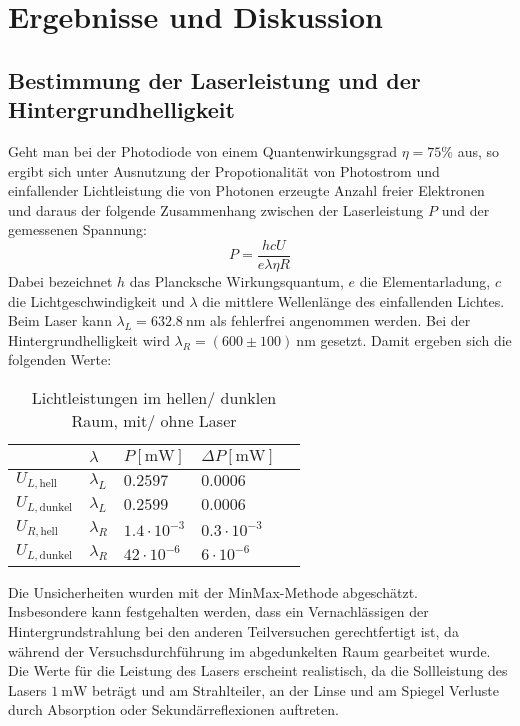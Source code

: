 \documentclass[11pt,a4paper,oneside]{scrartcl}
\begin{document}
\section{Ergebnisse und Diskussion}
\subsection{Bestimmung der Laserleistung und der Hintergrundhelligkeit}

Geht man bei der Photodiode von einem Quantenwirkungsgrad $\eta=75\%$ aus, so ergibt sich unter Ausnutzung der Propotionalität von Photostrom und einfallender Lichtleistung die von Photonen erzeugte Anzahl freier Elektronen und daraus der folgende Zusammenhang zwischen der Laserleistung $P$ und der gemessenen Spannung:
\begin{equation}\label{P_diode}
P=\frac{hcU}{e\lambda\eta R}
\end{equation}
Dabei bezeichnet $h$ das Plancksche Wirkungsquantum, $e$ die Elementarladung, $c$ die Lichtgeschwindigkeit und $\lambda$ die mittlere Wellenlänge des einfallenden Lichtes. Beim Laser kann $\lambda_L=632.8\ \mathrm{nm}$ als fehlerfrei angenommen werden. Bei der Hintergrundhelligkeit wird $\lambda_R=(600\pm 100)\ \mathrm{nm}$ gesetzt.
Damit ergeben sich die folgenden Werte:\\
\begin{table}[H]
\centering
\begin{tabular}{@{}lllll@{}}
\toprule
                        & $\lambda$   & $P [\mathrm{mW}]$  & $\Delta P[\mathrm{mW}]$ &  \\ \midrule
$U_{L,\mathrm{hell}}$   & $\lambda_L$ & $0.2597$           & $0.0006$                &  \\
$U_{L,\mathrm{dunkel}}$ & $\lambda_L$ & $0.2599$           & $0.0006$                &  \\
$U_{R,\mathrm{hell}}$   & $\lambda_R$ & $1.4\cdot 10^{-3}$ & $0.3\cdot 10^{-3}$      &  \\
$U_{L,\mathrm{dunkel}}$ & $\lambda_R$ & $42\cdot 10^{-6}$  & $6\cdot10^{-6}$         &  \\ \bottomrule
\end{tabular}
\caption{Lichtleistungen im hellen/ dunklen Raum, mit/ ohne Laser}
\end{table}
Die Unsicherheiten wurden mit der MinMax-Methode abgeschätzt.\\
Insbesondere kann festgehalten werden, dass ein Vernachlässigen der Hintergrundstrahlung bei den anderen Teilversuchen gerechtfertigt ist, da während der Versuchsdurchführung im abgedunkelten Raum gearbeitet wurde. Die Werte für die Leistung des Lasers erscheint realistisch, da die Sollleistung des Lasers $1\ \mathrm{mW}$ beträgt und am Strahlteiler, an der Linse und am Spiegel Verluste durch Absorption oder Sekundärreflexionen auftreten.\\
\end{document}
